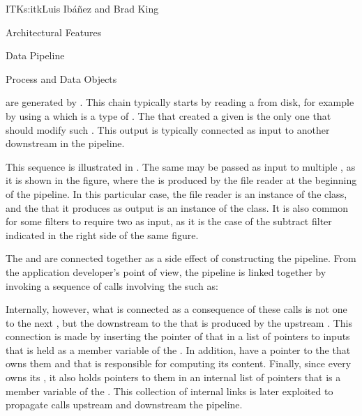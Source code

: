 \begin{aosachapter}{ITK}{s:itk}{Luis Ib\'{a}\~{n}ez and Brad King}
\begin{aosasect1}{Architectural Features}
\begin{aosasect2}{Data Pipeline}
\begin{aosasect3}{Process and Data Objects}

 are generated by . This chain typically starts by
reading a  from disk, for example by using a  which is
a type of . The  that created a given  is
the only one that should modify such . This output  is
typically connected as input to another  downstream in the pipeline.

This sequence is illustrated in .
The same  may be passed as input to multiple
, as it is shown in the figure, where the 
is produced by the file reader at the beginning of the pipeline.
In this particular case, the file reader is an instance of the
 class, and the  that it produces as
output is an instance of the  class.
It is also common for some filters to require two  as input,
as it is the case of the subtract filter indicated in the right side of
the same figure.

The  and  are connected together as a
side effect of constructing the pipeline. From the
application developer's point of view, the pipeline is linked together by
invoking a sequence of calls involving the  such as:

\begin{aosaitemize}
\item {}
\item {}
\item {}
\end{aosaitemize}

Internally, however, what is connected as a consequence of these calls is
not one  to the next , but the
downstream  to the  that is produced by
the upstream . This connection is made by
inserting the pointer of that  in a list of pointers to inputs
that is held as a member variable of the . In addition,
 have a pointer to the  that owns them
and that is responsible for computing its content. Finally, since every
 owns its , it also holds pointers to
them in an internal list of pointers that is a member variable of the
. This collection of internal links is later exploited to
propagate calls upstream and downstream the pipeline.


\end{aosasect3}
\end{aosasect2}
\end{aosasect1}
\end{aosachapter}
